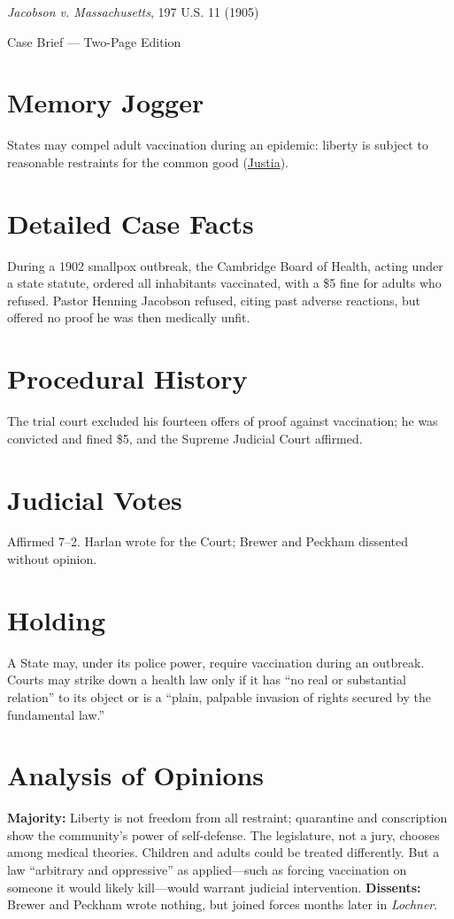 \documentclass[12pt]{article}
\begin{document}
\begin{center}
{\LARGE \textit{Jacobson v. Massachusetts}, 197 U.S. 11 (1905)\par}
\vspace{0.5em}
{\large Case Brief --- Two-Page Edition\par}
\end{center}

\section{Memory Jogger}
States may compel adult vaccination during an epidemic: liberty is subject to reasonable restraints for the common good (\href{https://supreme.justia.com/cases/federal/us/197/11/}{Justia}).

\section{Detailed Case Facts}
During a 1902 smallpox outbreak, the Cambridge Board of Health, acting under a state statute, ordered all inhabitants vaccinated, with a \$5 fine for adults who refused. Pastor Henning Jacobson refused, citing past adverse reactions, but offered no proof he was then medically unfit.

\section{Procedural History}
The trial court excluded his fourteen offers of proof against vaccination; he was convicted and fined \$5, and the Supreme Judicial Court affirmed.

\section{Judicial Votes}
Affirmed 7--2. Harlan wrote for the Court; Brewer and Peckham dissented without opinion.

\section{Holding}
A State may, under its police power, require vaccination during an outbreak. Courts may strike down a health law only if it has ``no real or substantial relation'' to its object or is a ``plain, palpable invasion of rights secured by the fundamental law.''

\section{Analysis of Opinions}
\textbf{Majority:} Liberty is not freedom from all restraint; quarantine and conscription show the community's power of self-defense. The legislature, not a jury, chooses among medical theories. Children and adults could be treated differently. But a law ``arbitrary and oppressive'' as applied---such as forcing vaccination on someone it would likely kill---would warrant judicial intervention. \textbf{Dissents:} Brewer and Peckham wrote nothing, but joined forces months later in \textit{Lochner}.
\end{document}
